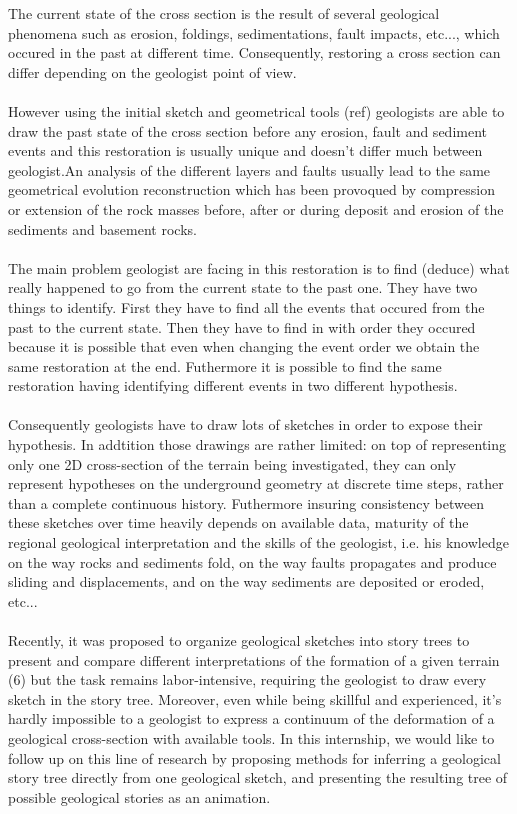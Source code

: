 \documentclass[12pt, a4paper]{memoir} %
\begin{document}
The current state of the cross section is the result of several geological phenomena such as erosion, foldings, sedimentations, fault impacts, etc..., which occured in the past at different time. Consequently, restoring a cross section can differ depending on the geologist point of view.\\\\
However using the initial sketch  and geometrical tools (ref) geologists are able to draw the past state of the cross section before any erosion, fault and sediment events and this restoration is usually unique and doesn't differ much between geologist.An analysis of the different layers and faults usually lead to the same geometrical evolution reconstruction which has been provoqued by compression or extension of the rock masses before, after or during deposit and erosion of the sediments and basement rocks. \\\\

The main problem geologist are facing in this restoration is to find (deduce) what really happened to go from the current state to the past one. They have two things to identify. First they have to find all the events that occured from the past to the current state. Then they have to find in with order they occured because it is possible that even when changing the event order we obtain the same restoration at the end. Futhermore it is possible to find the same restoration having identifying different events in two different hypothesis. \\\\

Consequently geologists have to draw lots of sketches in order to expose their hypothesis. In addtition those drawings are rather limited: on top of representing only one 2D cross-section of the terrain being investigated, they can only represent hypotheses on the underground geometry at discrete time steps, rather than a complete continuous history. Futhermore insuring consistency between these sketches over time heavily depends on available data, maturity of the regional geological interpretation and the skills of the geologist, i.e. his knowledge on the way rocks and sediments fold, on the way faults propagates and produce sliding and displacements, and on the way sediments are deposited or eroded, etc...\\\\


Recently, it was proposed to organize geological sketches into story trees to present and compare different interpretations of the formation of a given terrain (6) but the task remains labor-intensive, requiring the geologist to draw every sketch in the story tree. Moreover, even while being skillful and experienced, it’s hardly impossible to a geologist to express a continuum of the deformation of a geological cross-section with available tools.
In this internship, we would like to follow up on this line of research by proposing methods for inferring a geological story tree directly from one geological sketch, and presenting the resulting tree of possible geological stories as an animation.\\\\
\end{document}
